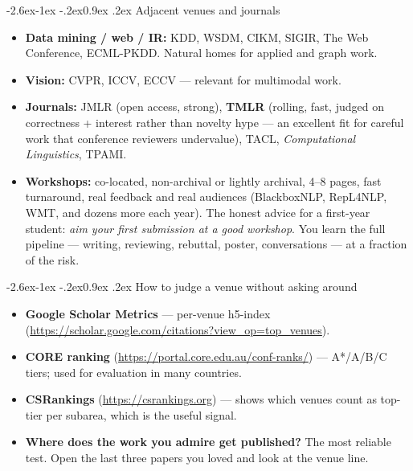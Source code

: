\documentclass[11pt,a4paper]{article}
\makeatletter
\renewcommand\subsection{\@startsection{subsection}{2}{\z@}%
  {-2.6ex\@plus -1ex \@minus -.2ex}{0.9ex \@plus .2ex}%
  {\normalfont\large\bfseries\color{brandlight}}}
\makeatother
\begin{document}
\subsection{Adjacent venues and journals}

\begin{itemize}
  \item \textbf{Data mining / web / IR:} KDD, WSDM, CIKM, SIGIR, The Web
        Conference, ECML-PKDD. Natural homes for applied and graph work.
  \item \textbf{Vision:} CVPR, ICCV, ECCV --- relevant for multimodal work.
  \item \textbf{Journals:} JMLR (open access, strong), \textbf{TMLR}
        (rolling, fast, judged on correctness + interest rather than
        novelty hype --- an excellent fit for careful work that conference
        reviewers undervalue), TACL, \emph{Computational Linguistics}, TPAMI.
  \item \textbf{Workshops:} co-located, non-archival or lightly archival,
        4--8 pages, fast turnaround, real feedback and real audiences
        (BlackboxNLP, RepL4NLP, WMT, and dozens more each year). The honest
        advice for a first-year student: \emph{aim your first submission at a
        good workshop}. You learn the full pipeline --- writing, reviewing,
        rebuttal, poster, conversations --- at a fraction of the risk.
\end{itemize}

\subsection{How to judge a venue without asking around}

\begin{itemize}
  \item \textbf{Google Scholar Metrics} --- per-venue h5-index
        (\url{https://scholar.google.com/citations?view_op=top_venues}).
  \item \textbf{CORE ranking} (\url{https://portal.core.edu.au/conf-ranks/})
        --- A*/A/B/C tiers; used for evaluation in many countries.
  \item \textbf{CSRankings} (\url{https://csrankings.org}) --- shows which
        venues count as top-tier per subarea, which is the useful signal.
  \item \textbf{Where does the work you admire get published?} The most
        reliable test. Open the last three papers you loved and look at the
        venue line.
\end{itemize}
\end{document}
